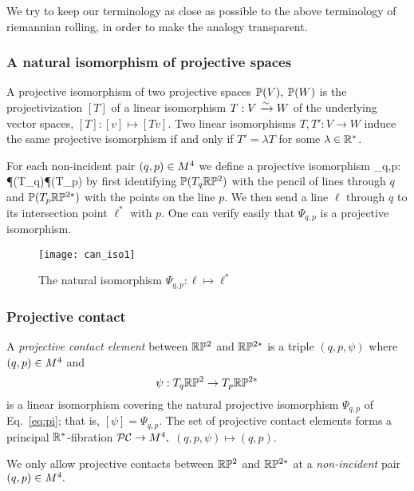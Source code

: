 We try to keep our   terminology as close as possible to the above terminology of riemannian rolling, in order to make the analogy transparent. 


\subsubsection{A natural isomorphism of projective spaces} 

 A projective isomorphism of two projective spaces $\P(V),$ $\P(W)$  is the projectivization $[T]$ of a linear isomorphism $T:V\eto W$ of the underlying vector spaces, $[T]:[v]\mapsto [Tv]$. Two linear isomorphisms $T, T':V\to W$ induce the same projective isomorphism if and only if $T'=\lambda T$ for some $\lambda \in \R^*$. 


For each non-incident pair $(q,p)\in\M$ we define a projective isomorphism  
\be\label{eq:pi}\Psi_{q,p}: \P(T_q\RPt)\eto\P(T_p\RPts) 
\ee
by first identifying  $\P(T_q\RPt)$ with the pencil of   lines through $q$ and $ \P(T_p\RPts)$ with the  points on the line  $p$. We then send a line $\ell$ through $q$ to its   intersection point $\ell^*$ with $p$.
One can verify easily that $\Psi_{q,p}$  is a projective isomorphism. 

\begin{figure}[h]\centering
\texttt{[image: can\_iso1]}
\caption{\small The natural isomorphism $\Psi_{q,p}:\ell\mapsto \ell^*$}
\end{figure}
%

\subsubsection{Projective contact} 




\begin{definition} 
 A {\em projective contact element} between $\RPt$ and  $\RPts$ is a triple  $(q,p,\psi)$ where $(q,p)\in\M$ and  
 $$\psi:T_q\RPt\to T_p\RPts$$
  is a  linear isomorphism covering the natural projective  isomorphism $\Psi_{q,p}$ of Eq.~\eqref{eq:pi}; that is, $[\psi]=\Psi_{q,p}.$ 
 The set of projective contact elements forms a principal $\R^*$-fibration  $\PC\to \M,$ $(q,p,\psi)\mapsto (q,p)$. 
\end{definition}

\begin{rmrk} We only allow projective contacts between $\RPt$ and $\RPts$  at a {\em non-incident} pair $(q,p)\in\M.$ 
 \end{rmrk}
 
